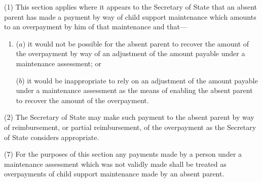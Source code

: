 \documentclass[12pt,a4paper]{article}
\begin{document}
(1) This section applies where it appears to the Secretary of State that an absent parent has made a payment by way of child support maintenance which amounts to an overpayment by him of that maintenance and that—
\begin{enumerate}\item[]
($a$) it would not be possible for the absent parent to recover the amount of the overpayment by way of an adjustment of the amount payable under a maintenance assessment; or

($b$) it would be inappropriate to rely on an adjustment of the amount payable under a maintenance assessment as the means of enabling the absent parent to recover the amount of the overpayment.
\end{enumerate}

(2) The Secretary of State may make such payment to the absent parent by way of reimbursement, or partial reimbursement, of the overpayment as the Secretary of State considers appropriate.

%
%
%
%

(7) For the purposes of this section any payments made by a person under a maintenance assessment which was not validly made shall be treated as overpayments of child support maintenance made by an absent parent.

%
\end{document}
